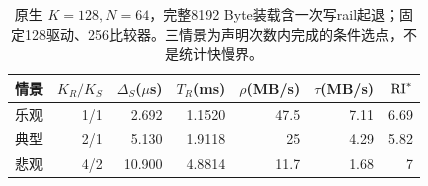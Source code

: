 \begin{table}[htbp]\centering\small
\begin{tabular}{@{}lrrrrrr@{}}\toprule
情景 & $K_R/K_S$ & $\Delta_S$($\mu$s) & $T_R$(ms) & $\rho$(MB/s) & $\tau$(MB/s) & $\mathrm{RI}^*$\\\midrule
乐观 & 1/1 & 2.692 & 1.1520 & 47.5 & 7.11 & 6.69\\
典型 & 2/1 & 5.130 & 1.9118 & 25 & 4.29 & 5.82\\
悲观 & 4/2 & 10.900 & 4.8814 & 11.7 & 1.68 & 7\\
\bottomrule\end{tabular}
\caption{原生 $K=128,N=64$，完整8192 Byte装载含一次写rail起退；固定128驱动、256比较器。三情景为声明次数内完成的条件选点，不是统计快慢界。}\end{table}
